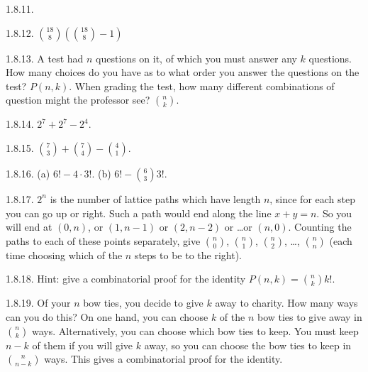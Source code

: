 \begin {itemize}
\begin{ans}{1.8.11.}
\end{ans}
\begin{ans}{1.8.12.}
		 ${18 \choose 8}\left({18 \choose 8} - 1\right)$
	
\end{ans}
\begin{ans}{1.8.13.}
		 A test had $n$ questions on it, of which you must answer any $k$ questions.  How many choices do you have as to what order you answer the questions on the test?  $P(n,k)$.  When grading the test, how many different combinations of question might the professor see?  ${n \choose k}$.
	
\end{ans}
\begin{ans}{1.8.14.}
		 $2^7 + 2^7 - 2^4$.
	
\end{ans}
\begin{ans}{1.8.15.}
		${7 \choose 3} + {7 \choose 4} - {4 \choose 1}$.
	
\end{ans}
\begin{ans}{1.8.16.}
		(a) $6! - 4\cdot 3!$.  (b) $6! - {6 \choose 3}3!$.
	
\end{ans}
\begin{ans}{1.8.17.}
		$2^n$ is the number of lattice paths which have length $n$, since for each step you can go up or right.  Such a path would end along the line $x + y = n$.  So you will end at $(0,n)$, or $(1,n-1)$ or $(2, n-2)$ or \ldots or $(n,0)$.  Counting the paths to each of these points separately, give ${n \choose 0}$, ${n \choose 1}$, ${n \choose 2}$, \ldots, ${n \choose n}$ (each time choosing which of the $n$ steps to be to the right).
	
\end{ans}
\begin{ans}{1.8.18.}
		Hint: give a combinatorial proof for the identity $P(n,k) = {n \choose k} k!$.
	
\end{ans}
\begin{ans}{1.8.19.}
		Of your $n$ bow ties, you decide to give $k$ away to charity.  How many ways can you do this?  On one hand, you can choose $k$ of the $n$ bow ties to give away in ${n \choose k}$ ways.  Alternatively, you can choose which bow ties to keep.  You must keep $n -k$ of them if you will give $k$ away, so you can choose the bow ties to keep in ${n \choose n-k}$ ways.  This gives a combinatorial proof for the identity.
	

\end{ans}
\end{itemize}
